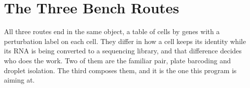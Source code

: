 
\section{The Three Bench Routes}
\label{sec:routes}

All three routes end in the same object, a table of cells by genes with a
perturbation label on each cell. They differ in how a cell keeps its identity
while its RNA is being converted to a sequencing library, and that difference
decides who does the work. Two of them are the familiar pair, plate barcoding
and droplet isolation. The third composes them, and it is the one this program
is aiming at.

